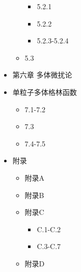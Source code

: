 \begin{itemize}
\begin{itemize}
\begin{itemize}
				\item [\CheckedBox] 5.2.1
				\item [\CheckedBox] 5.2.2
				\item [\Square] 5.2.3-5.2.4
			\end{itemize}
			\item[\Square] 5.3
	    \end{itemize}
    \item[\CheckedBox] 第六章 多体微扰论 
    \item[\DSquare] 单粒子多体格林函数 
    	\begin{itemize}
	        \item[\CheckedBox] 7.1-7.2
	        \item[\DSquare] 7.3
	        \item[\Square] 7.4-7.5 
    	\end{itemize}
    \item[\DSquare]  附录 \begin{itemize}
        \item[\CheckedBox] 附录A
        \item[\CheckedBox] 附录B
        \item[\DSquare] 附录C
        \begin{itemize}
	        \item[\CheckedBox] C.1-C.2
	        \item[\Square] C.3-C.7 
    	\end{itemize}
        \item[\CheckedBox] 附录D
    \end{itemize}
\end{itemize}
